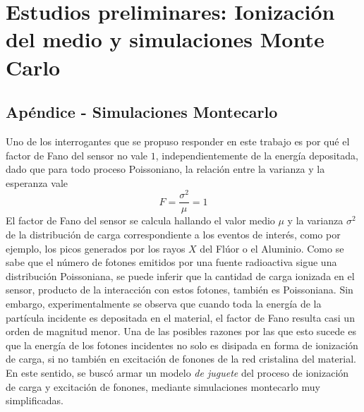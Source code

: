 \chapter{Estudios preliminares: Ionización del medio y simulaciones Monte Carlo}
\section{Apéndice - Simulaciones Montecarlo}
\noindent Uno de los interrogantes que se propuso responder en este trabajo es por qué el factor de Fano del sensor no vale $1$, independientemente de la energía depositada, dado que para todo proceso Poissoniano, la relación entre la varianza y la esperanza vale
\begin{equation*}
    F = \frac{\sigma^{2}}{\mu} = 1
\end{equation*} 
El factor de Fano del sensor se calcula hallando el valor medio $\mu$ y la varianza $\sigma^{2}$ de la distribución de carga correspondiente a los eventos de interés, como por ejemplo, los picos generados por los rayos $X$ del Flúor o el Aluminio. Como se sabe que el número de fotones emitidos por una fuente radioactiva sigue una distribución Poissoniana, se puede inferir que la cantidad de carga ionizada en el sensor, producto de la interacción con estos fotones, también es Poissoniana. Sin embargo, experimentalmente se observa que cuando toda la energía de la partícula incidente es depositada en el material, el factor de Fano resulta casi un orden de magnitud menor\cite{TesisKevin}. Una de las posibles razones por las que esto sucede es que la energía de los fotones incidentes no solo es disipada en forma de ionización de carga, si no también en excitación de fonones de la red cristalina del material.\\
\indent En este sentido, se buscó armar un modelo \textit{de juguete} del proceso de ionización de carga y excitación de fonones, mediante simulaciones montecarlo muy simplificadas.

